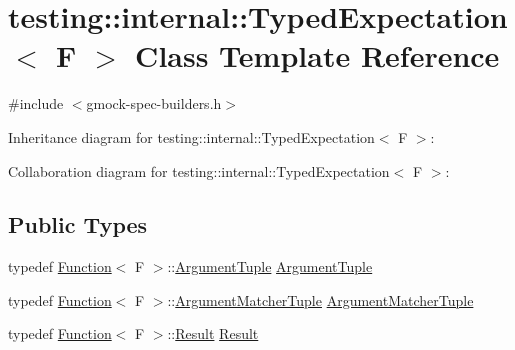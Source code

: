 \hypertarget{classtesting_1_1internal_1_1_typed_expectation}{}\section{testing\+:\+:internal\+:\+:Typed\+Expectation$<$ F $>$ Class Template Reference}
\label{classtesting_1_1internal_1_1_typed_expectation}


{\ttfamily \#include $<$gmock-\/spec-\/builders.\+h$>$}



Inheritance diagram for testing\+:\+:internal\+:\+:Typed\+Expectation$<$ F $>$\+:


Collaboration diagram for testing\+:\+:internal\+:\+:Typed\+Expectation$<$ F $>$\+:
\subsection*{Public Types}
\begin{DoxyCompactItemize}
\item 
typedef \hyperlink{structtesting_1_1internal_1_1_function}{Function}$<$ F $>$\+::\hyperlink{classtesting_1_1internal_1_1_typed_expectation_a9a91379262d101f435809ba4556d14fa}{Argument\+Tuple} \hyperlink{classtesting_1_1internal_1_1_typed_expectation_a9a91379262d101f435809ba4556d14fa}{Argument\+Tuple}
\item 
typedef \hyperlink{structtesting_1_1internal_1_1_function}{Function}$<$ F $>$\+::\hyperlink{classtesting_1_1internal_1_1_typed_expectation_a8f10e3906761cc5c10fa3561c6e8938e}{Argument\+Matcher\+Tuple} \hyperlink{classtesting_1_1internal_1_1_typed_expectation_a8f10e3906761cc5c10fa3561c6e8938e}{Argument\+Matcher\+Tuple}
\item 
typedef \hyperlink{structtesting_1_1internal_1_1_function}{Function}$<$ F $>$\+::\hyperlink{classtesting_1_1internal_1_1_typed_expectation_a6503597ee9d5ec940bfe8e51832b2422}{Result} \hyperlink{classtesting_1_1internal_1_1_typed_expectation_a6503597ee9d5ec940bfe8e51832b2422}{Result}
\end{DoxyCompactItemize}
